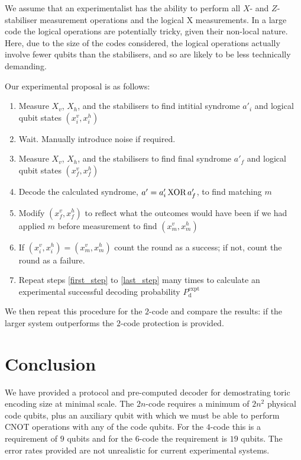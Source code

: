 We assume that an experimentalist has the ability to perform all $X$- and $Z$-stabiliser measurement operations and the logical X measurements. In a large code the logical operations are potentially tricky, given their non-local nature. Here, due to the size of the codes considered, the logical operations actually involve fewer qubits than the stabilisers, and so are likely to be less technically demanding.

Our experimental proposal is as follows:
\begin{enumerate}
  \item Measure  $X_v$, $X_h$, and the stabilisers to find intitial syndrome $a'_i$ and logical qubit states $(x^v_i, x^h_i)$\label{first_step}
  \item Wait. Manually introduce noise if required.
  \item Measure $X_v$, $X_h$, and the stabilisers to find final syndrome $a'_f$ and logical qubit states $(x^v_f, x^h_f)$
  \item Decode the calculated syndrome, $a' = a'_i \text{\,XOR\,} a'_f$, to find matching $m$ \label{decode_step}
  \item Modify $(x^v_f, x^h_f)$ to reflect what the outcomes would have been if we had applied $m$ before measurement to find $(x^v_m, x^h_m)$
  \item If $(x^v_i, x^h_i) = (x^v_m, x^h_m)$ count the round as a success; if not, count the round as a failure.\label{last_step}
  \item Repeat steps \ref{first_step} to \ref{last_step} many times to calculate an experimental successful decoding probability $P_\text{d}^\text{expt}$
\end{enumerate}

We then repeat this procedure for the $2$-code and compare the results: if the larger system outperforms the $2$-code protection is provided. 

\section{Conclusion}

We have provided a protocol and pre-computed decoder for demostrating toric encoding size at minimal scale. The $2n$-code requires a minimum of $2n^2$ physical code qubits, plus an auxiliary qubit with which we must be able to perform CNOT operations with any of the code qubits. For the $4$-code this is a requirement of $9$ qubits and for the $6$-code the requirement is $19$ qubits. The error rates provided are not unrealistic for current experimental systems. 

